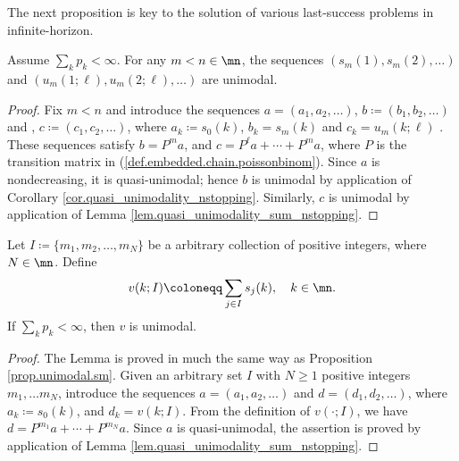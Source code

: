 \documentclass[11pt]{article}
\begin{document}
The next proposition is key to the solution of various last-success problems in  infinite-horizon.
 
 
\begin{assertion}\label{prop.unimodal.sm}
	Assume $\sum_k p_k < \infty$. 	For any $m < n  \in \mn$, the sequences $(s_m(1), s_m(2), \ldots)$ and $(u_m(1; \ell), u_m(2; \ell), \ldots)$ are unimodal. 
\end{assertion}
\begin{proof}
Fix $m < n$	and introduce the sequences $a=(a_1, a_2, \ldots)$, $b\coloneqq (b_1, b_2, \ldots)$ and , $c\coloneqq (c_1, c_2, \ldots)$, where  
	$ a_k \coloneqq 	s_{0}(k) $,  $ 	b_k = s_{m}(k)$ and $c_k = u_{m}(k; \ell)$ . These  sequences satisfy $b=P^ma$,  
	and  $c=P^\ell a + \cdots +P^m a $, where $P$ is the transition matrix  in (\ref{def.embedded.chain.poissonbinom}).  Since $a$   is nondecreasing, it is quasi-unimodal; hence  $b$ is  unimodal by application of Corollary \ref{cor.quasi_unimodality_nstopping}. Similarly, $c$  is  unimodal by application of Lemma \ref{lem.quasi_unimodality_sum_nstopping}.
\end{proof}
\begin{lemma}\label{lem.new}
Let $I \coloneqq \{m_1, m_2, \ldots, m_N\}$ be a arbitrary collection of positive integers, where $N \in \mn$.  Define 
	\begin{alignat}{2}\label{v_I}
		v(k; I) \coloneqq \sum_{j \in I} s_j(k),\quad k \in \mn.
	\end{alignat} 
If  $\sum_k p_k < \infty$, then $v$ is unimodal.
\end{lemma}
\begin{proof}

The Lemma is proved in much the same way as  Proposition \ref{prop.unimodal.sm}. Given an arbitrary set $I$ with $N \ge 1$ positive integers $m_1, \ldots m_N$, introduce the sequences $a=(a_1, a_2, \ldots)$ and $d = (d_1, d_2, \ldots)$, where $ a_k \coloneqq 	s_{0}(k) $, and $d_k = v(k; I)$. From the definition of $v(\cdot; I)$, we have $d=P^{m_1} a + \cdots +P^{m_N} a $.  Since $a$   is  quasi-unimodal, the assertion is proved  by application of Lemma \ref {lem.quasi_unimodality_sum_nstopping}.
\end{proof}
\end{document}
